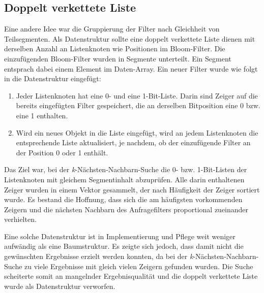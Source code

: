 \subsection{Doppelt verkettete Liste}\label{sec:verkettete-liste}
Eine andere Idee war die Gruppierung der Filter nach Gleichheit von Teilsegmenten. Als Datenstruktur sollte eine doppelt verkettete Liste dienen mit derselben Anzahl an Listenknoten wie Positionen im Bloom-Filter. Die einzufügenden Bloom-Filter wurden in Segmente unterteilt. Ein Segment entsprach dabei einem Element im Daten-Array. Ein neuer Filter wurde wie folgt in die Datenstruktur eingefügt:  
\begin{enumerate}
	\item Jeder Listenknoten hat eine 0- und eine 1-Bit-Liste. Darin sind Zeiger auf die bereits eingefügten Filter gespeichert, die an derselben Bitposition eine 0 bzw. eine 1 enthalten. 
	\item Wird ein neues Objekt in die Liste eingefügt, wird an jedem Listenknoten die entsprechende Liste aktualisiert, je nachdem, ob der einzufügende Filter an der Position 0 oder 1 enthält. 
\end{enumerate}
Das Ziel war, bei der \textit{k}-Nächsten-Nachbarn-Suche die 0- bzw. 1-Bit-Listen der Listenknoten mit gleichem Segmentinhalt abzuprüfen. Alle darin enthaltenen Zeiger wurden in einem Vektor gesammelt, der nach Häufigkeit der Zeiger sortiert wurde. Es bestand die Hoffnung, dass sich die am häufigsten vorkommenden Zeigern und die nächsten Nachbarn des Anfragefilters proportional zueinander verhielten.
 
Eine solche Datenstruktur ist in Implementierung und Pflege weit weniger aufwändig als eine Baumstruktur. Es zeigte sich jedoch, dass damit nicht die gewünschten Ergebnisse erzielt werden konnten, da bei der \textit{k}-Nächsten-Nachbarn-Suche zu viele Ergebnisse mit gleich vielen Zeigern gefunden wurden. Die Suche scheiterte somit an mangelnder Ergebnisqualität und die doppelt verkettete Liste wurde als Datenstruktur verworfen. 